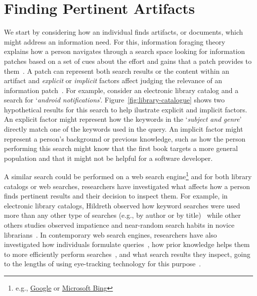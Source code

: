 


\section{Finding Pertinent Artifacts}
\label{cp2:task-approaches}


We start by considering how an individual finds 
artifacts, or documents, which might 
address an information need. 
For this, information foraging theory~\cite{Pirolli1999} explains how a person navigates through  
a search space looking for information patches  based on 
a set of cues about the effort and gains that a patch provides to them~\cite{Pirolli1999}.
A patch can represent both search results or the content within an artifact
and \textit{explicit} or \textit{implicit} factors affect judging the relevance 
of an information patch~\cite{saracevic1975}.
For example,
consider an electronic library catalog and a search for `\textit{android notifications}'.
Figure~\ref{fig:library-catalogue} shows two hypothetical results for this search
to help ilustrate explicit and implicit factors.
An explicit factor might represent how the keywords in the `\textit{subject and genre}' 
directly match one of the keywords used in the query. An implicit factor might represent 
a person's background or previous knowledge, such as how 
the person performing this search 
might know that the first book targets a more general population and 
that it might not be helpful for a software developer.








A similar search could be performed on a web search engine\footnote{e.g., \href{https://www.google.com/}{Google} or \href{https://www.bing.com/}{Microsoft Bing}}
and for both library catalogs or web searches, researchers have investigated 
what affects how a person finds pertinent results and their decision to inspect them.
For example, in electronic library catalogs,
Hildreth observed how keyword searches were used more than any other type of searches (e.g., by author or by title)~\cite{hildreth1997}
while other 
others studies observed impatience and near-random search habits in novice librarians~\cite{novotny2004don}.
In contemporary web search engines, researchers have  also 
investigated how individuals formulate queries~\cite{gross2005have, bendersky2012},
how prior knowledge helps them
to more efficiently perform searches~\cite{DeGraaf2014},
and what search results they inspect, going to the lengths
of using eye-tracking technology for this purpose~\cite{Cutrell2007, marcos2015}.



